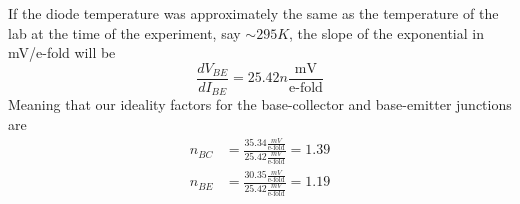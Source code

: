 If the diode temperature was approximately the same as the temperature of the lab at the time of the experiment, say \(\sim295K\),
the slope of the exponential in mV/e-fold will be 
\begin{equation*}
    \frac{dV_{BE}}{dI_{BE}} = 25.42n \frac{\text{mV}}{\text{e-fold}}
\end{equation*}
Meaning that our ideality factors for the base-collector and base-emitter junctions are
\begin{align*}
    n_{BC} &= \frac{{35.34 \frac{mV}{\text{e-fold}}}}{25.42\frac{mV}{\text{e-fold}}} = 1.39 \\
    n_{BE} &= \frac{{30.35 \frac{mV}{\text{e-fold}}}}{25.42\frac{mV}{\text{e-fold}}} = 1.19
\end{align*}

